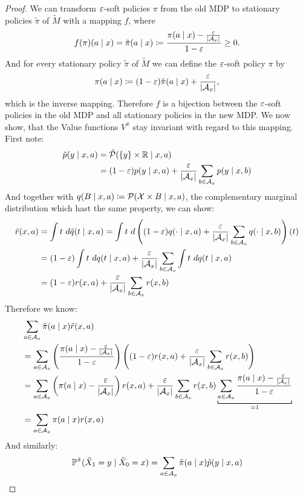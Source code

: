 \begin{proof}
	We can transform \(\varepsilon\)-soft policies \(\pi\) from the old MDP to stationary policies \(\tilde{\pi}\) of \(\tilde{M}\) with a mapping \(f\), where
	\[
		f(\pi)(a\mid x)=\tilde{\pi}(a\mid x)\coloneqq \frac{\pi(a\mid x)-\frac{\varepsilon}{|\mathcal{A}_x|}}{1-\varepsilon}\ge 0.
	\]
	And for every stationary policy \(\tilde{\pi}\) of \(\tilde{M}\) we can define the \(\varepsilon\)-soft policy \(\pi\) by
	\[
		\pi(a\mid x)\coloneqq (1-\varepsilon)\tilde{\pi}(a\mid x) + \frac{\varepsilon}{|\mathcal{A}_x|},
	\]
	which is the inverse mapping. Therefore \(f\) is a bijection between the \(\varepsilon\)-soft policies in the old MDP and all stationary policies in the new MDP. We now show, that the Value functions \(V^\pi\) stay invariant with regard to this mapping. 
	First note:
	\begin{align*}
		\tilde{p}(y\mid x,a)
		&=\tilde{\mathcal{P}}(\{y\}\times \mathbb{R}\mid x,a)\\
		&=(1-\varepsilon)p(y\mid x,a)+\frac{\varepsilon}{|\mathcal{A}_x|}\sum_{b\in\mathcal{A}_x}p(y\mid x,b)
	\end{align*}
	And together with \(q(B\mid x,a)\coloneqq \mathcal{P}(\mathcal{X}\times B \mid x,a)\), the complementary marginal distribution which hast the same property, we can show:
	\begin{align*}
		\tilde{r}(x,a)&=\int t\ d\tilde{q}(t \mid x,a)=\int t\ 
		d\left((1-\vep)q(\cdot\mid x,a) + \frac{\vep}{|\cA_x|}\sum_{b\in\cA_x}q(\cdot\mid x,b)\right)(t) \\
		&=(1-\vep)\int t\ dq(t\mid x,a) 
		+ \frac{\vep}{|\cA_x|}\sum_{b\in\cA_x} \int t\ dq(t\mid x,a)\\
		&=(1-\vep)r(x,a) + \frac{\vep}{|\cA_x|}\sum_{b\in\cA_x}r(x,b)
	\end{align*}
	Therefore we know:
	\begin{align*}
		&\sum_{a\in\cA_x}\tilde{\pi}(a\mid x)\tilde{r}(x,a)\\
		&=\sum_{a\in\cA_x} \left(\frac{\pi(a\mid x)-\frac{\vep}{|\cA_x|}}{1-\vep} \right)
		\left((1-\vep)r(x,a) + \frac{\vep}{|\cA_x|}\sum_{b\in\cA_x}r(x,b)\right)\\
		&=\sum_{a\in\cA_x}\left(\pi(a\mid x)-\frac{\vep}{|\cA_x|}\right)r(x,a) 
		+ \frac{\vep}{|\cA_x|}\sum_{b\in\cA_x}r(x,b) 
		\underbracket[0.7pt]{\sum_{a\in\cA_x}\frac{\pi(a\mid x)-\frac{\vep}{|\cA_x|}}{1-\vep}}_{
			=1
		}\\
		&=\sum_{a\in\cA_x}\pi(a\mid x)r(x,a)
	\end{align*}
	And similarly:
	\begin{align*}
		&\Pr^{\tilde{\pi}}(\tilde{X}_1=y\mid \tilde{X}_0=x) 
		=\sum_{a\in\cA_x}\tilde{\pi}(a\mid x)\tilde{p}(y\mid x,a)\\

\end{align*}
\end{proof}
